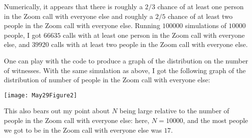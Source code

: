 \documentclass[11pt]{article}
\theoremstyle{definition}
\begin{document}
Numerically, it appears that there is roughly a $2/3$ chance of at least one person in the Zoom call with everyone else and roughly a $2/5$ chance of at least two people in the Zoom call with everyone else.  Running $100000$ simulations of $10000$ people, I got $66635$ calls with at least one person in the Zoom call with everyone else, and $39920$ calls with at least two people in the Zoom call with everyone else.

One can play with the code to produce a graph of the distribution on the number of witnesses.  With the same simulation as above, I got the following graph of the distribution of number of people in the Zoom call with everyone else:

\texttt{[image: May29Figure2]}

This also bears out my point about $N$ being large relative to the number of people in the Zoom call with everyone else: here, $N = 10000$, and the most people we got to be in the Zoom call with everyone else was $17$.
\end{document}
